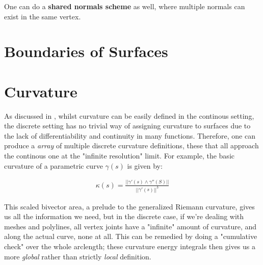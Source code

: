 \spa

One can do a \textbf{shared normals scheme} as well, where
multiple normals can exist in the same vertex.
\section{Boundaries of Surfaces} \label{boundary}


\section{Curvature} \label{curvature}

As discussed in \cite{discreteexterior1}, whilst curvature can be
easily defined in the continous setting, the discrete setting has no
trivial way of assigning curvature to surfaces due to the lack of 
differentiability and continuity in many functions. Therefore,
one can produce a \textit{array} of multiple discrete curvature
definitions, these that all approach the continous one at the
"infinite resolution" limit. For example, the basic curvature of a 
parametric curve $\gamma(s)$ is given by:

\begin{example}
\begin{align*}
\kappa(s) = \frac{|| \gamma'(s) \wedge \gamma''(S) ||}{|| \gamma'(s) ||^3}
\end{align*}    
\end{example}


This scaled bivector area, a prelude to the generalized Riemann curvature,
gives us all the information we need, but in the discrete case, if
we're dealing with meshes and polylines, all vertex joints have
a "infinite" amount of curvature, and along the actual curve, none at all.
This can be remedied by doing a "cumulative check" over the whole arclength;
these curvature energy integrals then gives us a more \textit{global}
rather than strictly \textit{local} definition.

